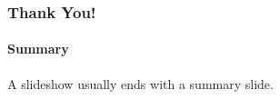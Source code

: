 \documentclass[10pt,]{beamer}
\theoremstyle{mystyle}
\begin{document}
\begin{frame}\frametitle{Thank You!}
    \framesubtitle{Summary}
    A slideshow usually ends with a summary slide.
\end{frame}


\end{document}
